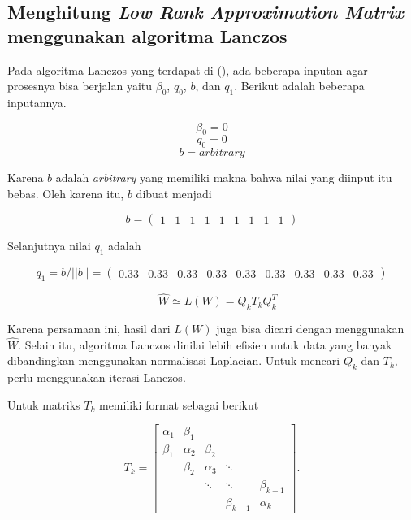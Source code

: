 \subsection{Menghitung \textit{Low Rank Approximation Matrix} menggunakan algoritma Lanczos}

Pada algoritma Lanczos yang terdapat di (\cite{golub_matrix_computation_3_edition}), ada beberapa inputan agar prosesnya bisa berjalan yaitu $\beta_0$, $q_0$, $b$, dan $q_1$. Berikut adalah beberapa inputannya.

\begin{equation*}
    \beta_0 = 0
\end{equation*}
\begin{equation*}
    q_0 = 0
\end{equation*}
\begin{equation*}
    b = arbitrary
\end{equation*}

Karena $b$ adalah \textit{arbitrary} yang memiliki makna bahwa nilai yang diinput itu bebas. Oleh karena itu, $b$ dibuat menjadi

\begin{equation*}
    b = \begin{pmatrix}
        1 & 1 & 1 & 1 & 1 & 1 & 1 & 1 & 1
    \end{pmatrix}
\end{equation*}

Selanjutnya nilai $q_1$ adalah

\begin{equation*}
    q_1 = b/||b|| = \begin{pmatrix}
        0.33 & 0.33 & 0.33 & 0.33 & 0.33 & 0.33 & 0.33 & 0.33 & 0.33 
    \end{pmatrix}
\end{equation*}

\begin{equation}
    \quad \hat{W} \simeq L(W)=Q_{k} T_{k} Q_{k}^{T}
\end{equation}

Karena persamaan ini, hasil dari $L(W)$ juga bisa dicari dengan menggunakan $\hat{W}$. Selain itu, algoritma Lanczos dinilai lebih efisien untuk data yang banyak dibandingkan menggunakan normalisasi Laplacian.  Untuk mencari $Q_k$ dan $T_k$, perlu menggunakan iterasi Lanczos. 

Untuk matriks $T_k$ memiliki format sebagai berikut

\begin{equation*}
T_{k}=\left[\begin{array}{ccccc}
\alpha_{1} & \beta_{1} & & & \\
\beta_{1} & \alpha_{2} & \beta_{2} & & \\
& \beta_{2} & \alpha_{3} & \ddots & \\
& & \ddots & \ddots & \beta_{k-1} \\
& & & \beta_{k-1} & \alpha_{k}
\end{array}\right] .
\end{equation*}

